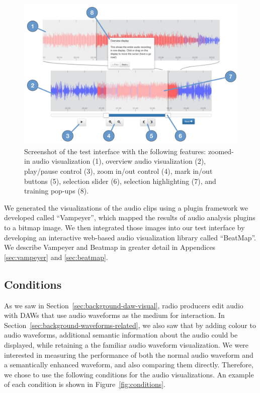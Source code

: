 \begin{figure}[h]
\centering
\includegraphics[width=\columnwidth]{figs/browser-audio-interface.pdf}
\caption{Screenshot of the test interface with the following features:
zoomed-in audio visualization (1),
overview audio visualization (2),
play/pause control (3),
zoom in/out control (4),
mark in/out buttons (5),
selection slider (6),
selection highlighting (7),
and training pop-ups (8).}
\label{fig:visualization-interface}
\end{figure}



We generated the visualizations of the audio clips using a plugin framework we developed called ``Vampeyer'', which
mapped the results of audio analysis plugins to a bitmap image. We then integrated those images into our test interface
by developing an interactive web-based audio visualization library called ``BeatMap''.  We describe Vampeyer and
Beatmap in greater detail in Appendices \ref{sec:vampeyer} and \ref{sec:beatmap}.

\subsection{Conditions}
As we saw in Section~\ref{sec:background-daw-visual}, radio producers edit audio with DAWs that use audio waveforms as
the medium for interaction. In Section~\ref{sec:background-waveforms-related}, we also saw that by adding colour to
audio waveforms, additional semantic information about the audio could be displayed, while retaining a the familiar
audio waveform visualization.  We were interested in measuring the performance of both the normal audio waveform and a
semantically enhanced waveform, and also comparing them directly.  Therefore, we chose to use the following conditions
for the audio visualizations. An example of each condition is shown in Figure~\ref{fig:conditions}.

